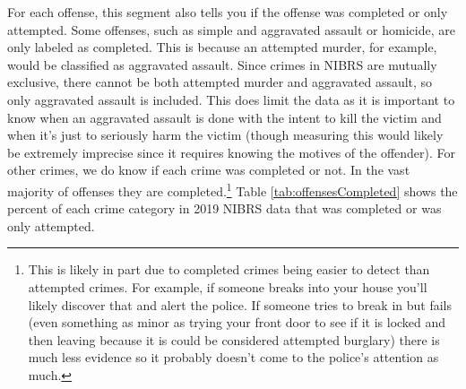 \documentclass[
  12pt,
  openany]{book}
\begin{document}
For each offense, this segment also tells you if the offense was completed or only attempted. Some offenses, such as simple and aggravated assault or homicide, are only labeled as completed. This is because an attempted murder, for example, would be classified as aggravated assault. Since crimes in NIBRS are mutually exclusive, there cannot be both attempted murder and aggravated assault, so only aggravated assault is included. This does limit the data as it is important to know when an aggravated assault is done with the intent to kill the victim and when it's just to seriously harm the victim (though measuring this would likely be extremely imprecise since it requires knowing the motives of the offender). For other crimes, we do know if each crime was completed or not. In the vast majority of offenses they are completed.\footnote{This is likely in part due to completed crimes being easier to detect than attempted crimes. For example, if someone breaks into your house you'll likely discover that and alert the police. If someone tries to break in but fails (even something as minor as trying your front door to see if it is locked and then leaving because it is could be considered attempted burglary) there is much less evidence so it probably doesn't come to the police's attention as much.} Table \ref{tab:offensesCompleted} shows the percent of each crime category in 2019 NIBRS data that was completed or was only attempted.
\end{document}
